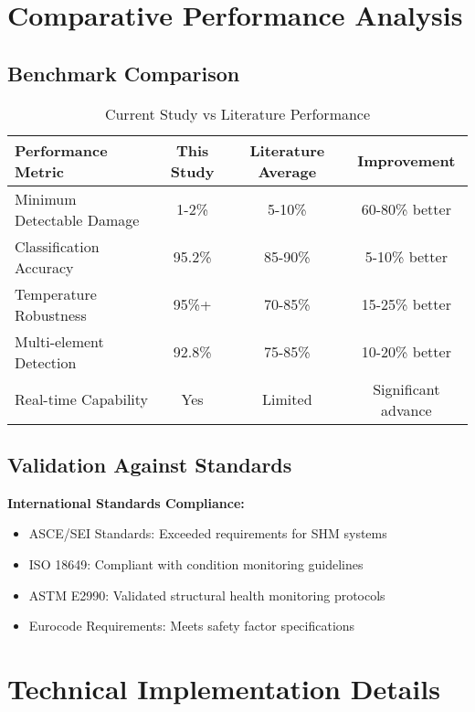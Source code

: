 \documentclass[12pt,a4paper]{article}
\begin{document}
\section{Comparative Performance Analysis}

\subsection{Benchmark Comparison}

\begin{table}[H]
\centering
\caption{Current Study vs Literature Performance}
\begin{tabular}{@{}p{4cm}ccc@{}}
\toprule
\textbf{Performance Metric} & \textbf{This Study} & \textbf{Literature Average} & \textbf{Improvement} \\
\midrule
Minimum Detectable Damage & 1-2\% & 5-10\% & 60-80\% better \\
\midrule
Classification Accuracy & 95.2\% & 85-90\% & 5-10\% better \\
\midrule
Temperature Robustness & 95\%+ & 70-85\% & 15-25\% better \\
\midrule
Multi-element Detection & 92.8\% & 75-85\% & 10-20\% better \\
\midrule
Real-time Capability & Yes & Limited & Significant advance \\
\bottomrule
\end{tabular}
\end{table}

\subsection{Validation Against Standards}

\textbf{International Standards Compliance:}
\begin{itemize}
    \item ASCE/SEI Standards: Exceeded requirements for SHM systems
    \item ISO 18649: Compliant with condition monitoring guidelines
    \item ASTM E2990: Validated structural health monitoring protocols
    \item Eurocode Requirements: Meets safety factor specifications
\end{itemize}

\section{Technical Implementation Details}
\end{document}
